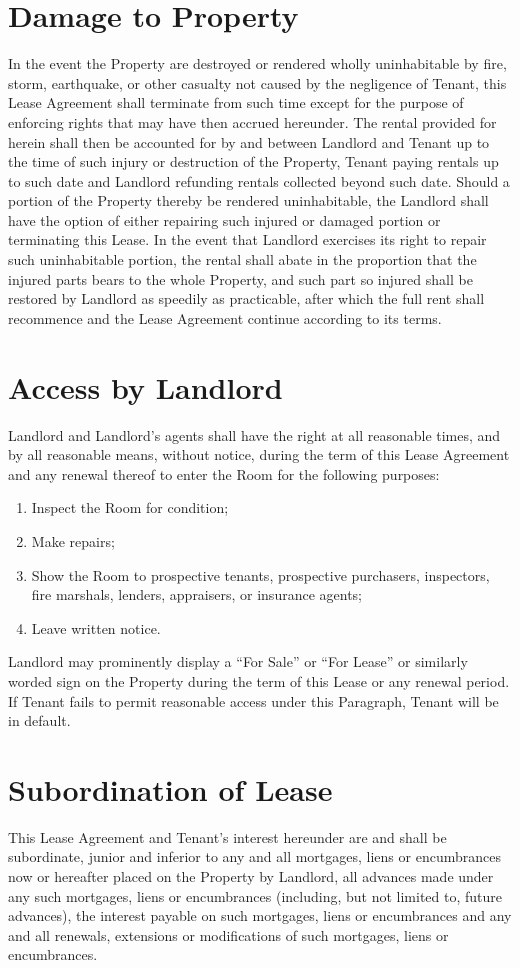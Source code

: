 \documentclass{amsart}
\begin{document}
\section{Damage to Property}
In the event the Property are destroyed or rendered wholly uninhabitable by
fire, storm, earthquake, or other casualty not caused by the negligence of
Tenant, this Lease Agreement shall terminate from such time except for the
purpose of enforcing rights that may have then accrued hereunder. The rental
provided for herein shall then be accounted for by and between Landlord and
Tenant up to the time of such injury or destruction of the Property, Tenant
paying rentals up to such date and Landlord refunding rentals collected beyond
such date. Should a portion of the Property thereby be rendered uninhabitable,
the Landlord shall have the option of either repairing such injured or damaged
portion or terminating this Lease. In the event that Landlord exercises its
right to repair such uninhabitable portion, the rental shall abate in the
proportion that the injured parts bears to the whole Property, and such part so
injured shall be restored by Landlord as speedily as practicable, after which
the full rent shall recommence and the Lease Agreement continue according to its
terms.
\section{Access by Landlord}
Landlord and Landlord's agents shall have the right at all reasonable times, and
by all reasonable means, without notice, during the term of this  Lease
Agreement and any renewal thereof to enter the Room for the following purposes:
\begin{enumerate}
    \item Inspect the Room for condition;
    \item Make repairs;
    \item Show the Room to prospective tenants, prospective purchasers,
        inspectors, fire marshals, lenders, appraisers, or insurance agents;
    \item Leave written notice.
\end{enumerate}
Landlord may prominently display a ``For Sale'' or ``For Lease'' or
similarly worded sign on the Property during the term of this Lease or any
renewal period.  If Tenant fails to permit reasonable access under this
Paragraph, Tenant will be in default.
\section{Subordination of Lease}
This Lease Agreement and Tenant's interest hereunder are and shall be
subordinate, junior and inferior to any and all mortgages, liens or encumbrances
now or hereafter placed on the Property by Landlord, all advances made under any
such mortgages, liens or encumbrances (including, but not limited to, future
advances), the interest payable on such mortgages, liens or encumbrances and any
and all renewals, extensions or modifications of such mortgages, liens or
encumbrances.
\end{document}
